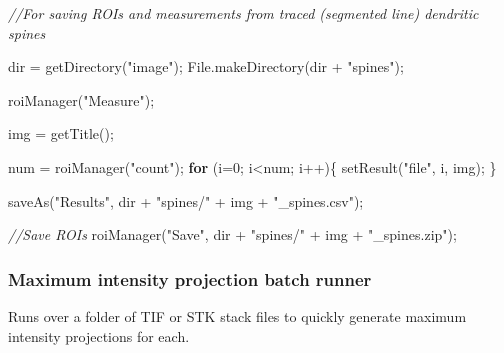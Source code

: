 \documentclass[
  12pt,
  a4paper,
]{book}
\newenvironment{Shaded}{}{}
\newcommand{\CommentTok}[1]{\textcolor[rgb]{0.38,0.63,0.69}{\textit{#1}}}
\newcommand{\ControlFlowTok}[1]{\textcolor[rgb]{0.00,0.44,0.13}{\textbf{#1}}}
\newcommand{\DecValTok}[1]{\textcolor[rgb]{0.25,0.63,0.44}{#1}}
\newcommand{\NormalTok}[1]{#1}
\newcommand{\OperatorTok}[1]{\textcolor[rgb]{0.40,0.40,0.40}{#1}}
\newcommand{\StringTok}[1]{\textcolor[rgb]{0.25,0.44,0.63}{#1}}
\begin{document}
\begin{Shaded}
\begin{Highlighting}[]
\CommentTok{//For saving ROIs and measurements from traced (segmented line) dendritic spines}

\NormalTok{dir }\OperatorTok{=}\NormalTok{ getDirectory}\OperatorTok{(}\StringTok{"image"}\OperatorTok{);}
\NormalTok{File}\OperatorTok{.}\NormalTok{makeDirectory}\OperatorTok{(}\NormalTok{dir }\OperatorTok{+} \StringTok{"spines"}\OperatorTok{);}

\NormalTok{roiManager}\OperatorTok{(}\StringTok{"Measure"}\OperatorTok{);}

\NormalTok{img }\OperatorTok{=}\NormalTok{ getTitle}\OperatorTok{();}

\NormalTok{num }\OperatorTok{=}\NormalTok{ roiManager}\OperatorTok{(}\StringTok{"count"}\OperatorTok{);}
\ControlFlowTok{for} \OperatorTok{(}\NormalTok{i}\OperatorTok{=}\DecValTok{0}\OperatorTok{;}\NormalTok{ i}\OperatorTok{\textless{}}\NormalTok{num}\OperatorTok{;}\NormalTok{ i}\OperatorTok{++)\{}
\NormalTok{    setResult}\OperatorTok{(}\StringTok{"file"}\OperatorTok{,}\NormalTok{ i}\OperatorTok{,}\NormalTok{ img}\OperatorTok{);}
\OperatorTok{\}}

\NormalTok{saveAs}\OperatorTok{(}\StringTok{"Results"}\OperatorTok{,}\NormalTok{ dir }\OperatorTok{+} \StringTok{"spines/"} \OperatorTok{+}\NormalTok{ img }\OperatorTok{+} \StringTok{"\_spines.csv"}\OperatorTok{);}

\CommentTok{//Save ROIs}
\NormalTok{roiManager}\OperatorTok{(}\StringTok{"Save"}\OperatorTok{,}\NormalTok{ dir }\OperatorTok{+} \StringTok{"spines/"} \OperatorTok{+}\NormalTok{ img }\OperatorTok{+} \StringTok{"\_spines.zip"}\OperatorTok{);}
\end{Highlighting}
\end{Shaded}

\subsubsection{Maximum intensity projection batch runner}\label{maximum-intensity-projection-batch-runner}

Runs over a folder of TIF or STK stack files to quickly generate maximum intensity projections for each.
\end{document}
